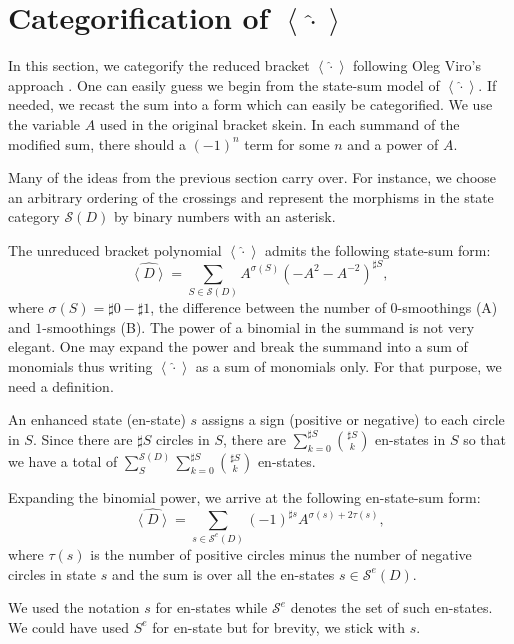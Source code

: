\section{Categorification of $\left< \hat\cdot \right>$}

In this section, we categorify the reduced bracket $\left< \hat\cdot \right>$ following Oleg Viro's approach \cite{OlegViro2004}. One can easily guess we begin from the state-sum model of $\left< \hat\cdot \right>$. If needed, we recast the sum into a form which can easily be categorified. We use the variable $A$ used in the original bracket skein. In each summand of the modified sum, there should a $(-1)^n$ term for some $n$ and a power of $A$.

Many of the ideas from the previous section carry over. For instance, we choose an arbitrary ordering of the crossings and represent the morphisms in the state category $\mathcal{S}(D)$ by binary numbers with an asterisk. 

The unreduced bracket polynomial $\left< \hat\cdot \right>$ admits the following state-sum form:
\begin{equation}
\label{eq:25}
\hat{\left< D \right>} = \sum_{S \in \mathcal{S}(D)}^{} A^{\sigma(S)}(-A^2 - A^{-2})^{\sharp S},
\end{equation}
where $\sigma(S) = \sharp 0 - \sharp 1$, the difference between the number of $0$-smoothings (A) and $1$-smoothings (B). The power of a binomial in the summand is not very elegant. One may expand the power and break the summand into a sum of monomials thus writing $\left< \hat\cdot \right>$ as a sum of monomials only. For that purpose, we need a definition.

An enhanced state (en-state) $s$ assigns a sign (positive or negative) to each circle in $S$. Since there are $\sharp S$ circles in $S$, there are $\sum_{k=0}^{\sharp S}\binom{\sharp S}{k}$ en-states in $S$ so that we have a total of $\sum_S^{\mathcal{S}(D)} \sum_{k=0}^{\sharp S}\binom{\sharp S}{k}$ en-states.

Expanding the binomial power, we arrive at the following en-state-sum form: 
\begin{equation}
\label{eq:26}
\hat{\left< D \right>} = \sum_{s \in \mathcal{S}^e(D)}^{} (-1)^{\sharp s} A^{\sigma(s) + 2\tau(s)},
\end{equation}
where $\tau(s)$ is the number of positive circles minus the number of negative circles in state $s$ and the sum is over all the en-states $s \in \mathcal{S}^e(D)$.

\begin{remark}
We used the notation $s$ for en-states while $\mathcal{S}^e$ denotes the set of such en-states. We could have used $S^e$ for en-state but for brevity, we stick with $s$.
\end{remark}

